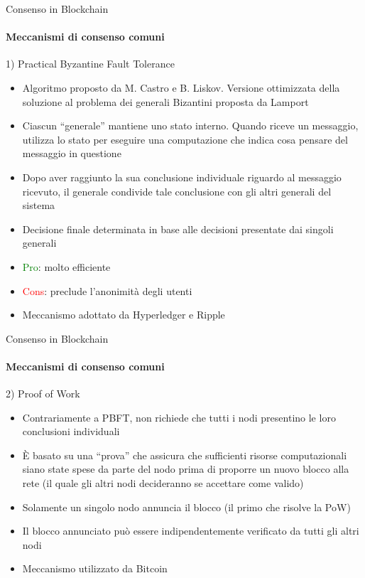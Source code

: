 \documentclass{beamer}
\newcommand\red[1]{\textcolor{red}{#1}}
\begin{document}
  \begin{frame}{Consenso in Blockchain}
    \framesubtitle{Meccanismi di consenso comuni}
    \begin{block}{1) Practical Byzantine Fault Tolerance}
      \begin{itemize}
        \item Algoritmo proposto da M. Castro e B. Liskov. Versione ottimizzata della soluzione al problema dei generali Bizantini proposta da Lamport \cite{castro1999practical} 
        \item Ciascun ``generale'' mantiene uno stato interno. Quando riceve un messaggio, utilizza lo stato per eseguire una computazione che indica cosa pensare del messaggio in questione 
        \item Dopo aver raggiunto la sua conclusione individuale riguardo al messaggio ricevuto, il generale condivide tale conclusione con gli altri generali del sistema
        \item Decisione finale determinata in base alle decisioni presentate dai singoli generali \pause
        \item \textcolor{green}{Pro}: molto efficiente \pause
        \item \red{Cons}: preclude l'anonimità degli utenti \pause
        \item Meccanismo adottato da Hyperledger e Ripple
      \end{itemize}
    \end{block}
  \end{frame}




  \begin{frame}{Consenso in Blockchain}
    \framesubtitle{Meccanismi di consenso comuni}
    \begin{block}{2) Proof of Work}
      \begin{itemize}
        \item Contrariamente a PBFT, non richiede che tutti i nodi presentino le loro conclusioni individuali 
        \item È basato su una ``prova'' che assicura che sufficienti risorse computazionali siano state spese da parte del nodo prima di proporre un nuovo blocco alla rete (il quale gli altri nodi decideranno se accettare come valido)
        \item Solamente un singolo nodo annuncia il blocco (il primo che risolve la PoW) 
        \item Il blocco annunciato può essere indipendentemente verificato da tutti gli altri nodi \pause
        \item Meccanismo utilizzato da Bitcoin
      \end{itemize}
    \end{block}
  \end{frame}
\end{document}
